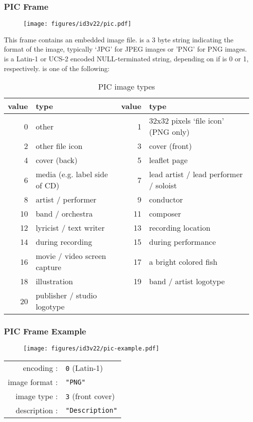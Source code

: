 \subsubsection{PIC Frame}
\begin{figure}[h]
\texttt{[image: figures/id3v22/pic.pdf]}
\end{figure}
\par
\noindent
This frame contains an embedded image file.
 is a 3 byte string indicating the format of the image,
typically `JPG' for JPEG images or 'PNG' for PNG images.
 is a Latin-1 or UCS-2 encoded NULL-terminated string,
depending on if  is 0 or 1, respectively.
 is one of the following:
\begin{table}[h]
{
\begin{tabular}{|r|l||r|l|}
\hline
value & type & value & type \\
\hline
0 & other & 1 & 32x32 pixels `file icon' (PNG only) \\
2 & other file icon & 3 & cover (front) \\
4 & cover (back) & 5 & leaflet page \\
6 & media (e.g. label side of CD) & 7 & lead artist / lead performer / soloist \\
8 & artist / performer & 9 & conductor \\
10 & band / orchestra & 11 & composer \\
12 & lyricist / text writer & 13 & recording location \\
14 & during recording & 15 & during performance \\
16 & movie / video screen capture & 17 & a bright colored fish \\
18 & illustration & 19 & band / artist logotype \\
20 & publisher / studio logotype & &  \\
\hline
\end{tabular}
\caption{PIC image types}
}
\end{table}

\clearpage

\subsubsection{PIC Frame Example}
\begin{figure}[h]
  \texttt{[image: figures/id3v22/pic-example.pdf]}
\end{figure}
\begin{table}[h]
  \begin{tabular}{rl}
    encoding : & \texttt{0} (Latin-1) \\
    image format : & \texttt{"PNG"} \\
    image type : & \texttt{3} (front cover) \\
    description : & \texttt{"Description"} \\
\end{tabular}
\end{table}

